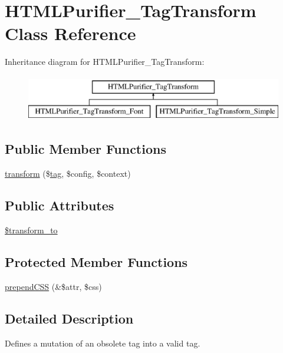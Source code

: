 \hypertarget{classHTMLPurifier__TagTransform}{\section{H\+T\+M\+L\+Purifier\+\_\+\+Tag\+Transform Class Reference}
\label{classHTMLPurifier__TagTransform}
}
Inheritance diagram for H\+T\+M\+L\+Purifier\+\_\+\+Tag\+Transform\+:\begin{figure}[H]
\begin{center}
\leavevmode
\includegraphics[height=2.000000cm]{classHTMLPurifier__TagTransform}
\end{center}
\end{figure}
\subsection*{Public Member Functions}
\begin{DoxyCompactItemize}
\item 
\hyperlink{classHTMLPurifier__TagTransform_a696672f39e8f3bbd3100b927c714340f}{transform} (\$\hyperlink{classtag}{tag}, \$config, \$context)
\end{DoxyCompactItemize}
\subsection*{Public Attributes}
\begin{DoxyCompactItemize}
\item 
\hyperlink{classHTMLPurifier__TagTransform_af9e40f17af8a63f26381fa968aeb7c89}{\$transform\+\_\+to}
\end{DoxyCompactItemize}
\subsection*{Protected Member Functions}
\begin{DoxyCompactItemize}
\item 
\hyperlink{classHTMLPurifier__TagTransform_a59503084555a5f7cd3c56f5e9a4293ac}{prepend\+C\+S\+S} (\&\$attr, \$css)
\end{DoxyCompactItemize}


\subsection{Detailed Description}
Defines a mutation of an obsolete tag into a valid tag. 

